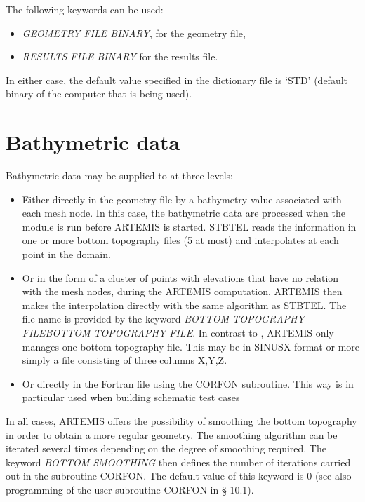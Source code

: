 The following keywords can be used:

\begin{itemize}
\item  \textit{GEOMETRY FILE BINARY}, for the geometry file,

\item  \textit{RESULTS FILE BINARY} for the results file.
\end{itemize}

In either case, the default value specified in the dictionary file is `STD'
(default binary of the computer that is being used).


\section{Bathymetric data}

Bathymetric data may be supplied to \artemis{} at three levels:

\begin{itemize}
\item  Either directly in the geometry file by a bathymetry value associated
  with each mesh node. In this case, the bathymetric data are processed when
    the \stbtel{} module is run before ARTEMIS is started. STBTEL reads the
    information in one or more bottom topography files (5 at most) and
    interpolates at each point in the domain.

\item  Or in the form of a cluster of points with elevations that have no
  relation with the mesh nodes, during the ARTEMIS computation. ARTEMIS then
    makes the interpolation directly with the same algorithm as STBTEL\@. The
    file name is provided by the keyword \textit{BOTTOM TOPOGRAPHY FILEBOTTOM
    TOPOGRAPHY FILE}. In contrast to \stbtel{}, ARTEMIS only manages one bottom
    topography file. This may be in SINUSX format or more simply a file
    consisting of three columns X,Y,Z.

\item  Or directly in the Fortran file using the CORFON subroutine. This way is
  in particular used when building schematic test cases
\end{itemize}

In all cases, ARTEMIS offers the possibility of smoothing the bottom topography
in order to obtain a more regular geometry. The smoothing algorithm can be
iterated several times depending on the degree of smoothing required. The
keyword \textit{BOTTOM SMOOTHING} then defines the number of iterations carried
out in the subroutine CORFON\@. The default value of this keyword is 0 (see also
programming of the user subroutine CORFON in {\S} 10.1).


